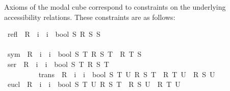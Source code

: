 \begin{isabellebody}
\isamarkuptrue%
%
\isamarkuptrue%
%
\begin{isamarkuptext}%
Axioms of the modal cube correspond to constraints on the underlying accessibility relations.
These constraints are as follows:%
\end{isamarkuptext}%
\isamarkuptrue%
\isanewline
{}\isamarkupfalse%
\ {\isachardoublequoteopen}refl\ {\isasymequiv}\ {\isasymlambda}R\ {\isacharcolon}{\isacharcolon}\ {\isacharparenleft}i\ {\isasymRightarrow}\ i\ {\isasymRightarrow}\ bool{\isacharparenright}{\isachardot}\ {\isasymforall}S{\isachardot}\ R\ S\ S{\isachardoublequoteclose}\ \ \ \ \ \ \ \ \ \ \ \ \ \ \ \ \ \ \ \ \ \ \ \ \ \ \ \ \ \ \ \ \ \ \ \ \ \ \ \ \ \ \ \ \ \ \ \ \ \ \ \ \ \ \ \ \ %
\isanewline
{}\isamarkupfalse%
\ {\isachardoublequoteopen}sym\ {\isasymequiv}\ {\isasymlambda}R\ {\isacharcolon}{\isacharcolon}\ {\isacharparenleft}i\ {\isasymRightarrow}\ i\ {\isasymRightarrow}\ bool{\isacharparenright}{\isachardot}\ {\isasymforall}S\ T{\isachardot}\ {\isacharparenleft}R\ S\ T\ {\isasymlongrightarrow}\ R\ T\ S{\isacharparenright}{\isachardoublequoteclose}\ \ \ \ \ \ \ \ \ \ \ \ \ \ \ \ \ \ \ \ \ \ \ \ \ \ \ \ \ \ \ \ %
\isanewline
{}\isamarkupfalse%
\ {\isachardoublequoteopen}ser\ {\isasymequiv}\ {\isasymlambda}R\ {\isacharcolon}{\isacharcolon}\ {\isacharparenleft}i\ {\isasymRightarrow}\ i\ {\isasymRightarrow}\ bool{\isacharparenright}{\isachardot}\ {\isasymforall}S{\isachardot}\ {\isasymexists}T{\isachardot}\ R\ S\ T{\isachardoublequoteclose}\ \ \ \ \ \ \ \ \ \ \ \ \ \ \ \ \ \ \ \ \ \ \ \ \ \ \ \ \ \ \ \ \ \ \ \ \ \ \ \ \ \ \ \ \ \ \ \ \ \ %
\isanewline
{}\isamarkupfalse%
\ {\isachardoublequoteopen}trans\ {\isasymequiv}\ {\isasymlambda}R\ {\isacharcolon}{\isacharcolon}\ {\isacharparenleft}i\ {\isasymRightarrow}\ i\ {\isasymRightarrow}\ bool{\isacharparenright}{\isachardot}\ {\isasymforall}S\ T\ U{\isachardot}\ {\isacharparenleft}R\ S\ T\ {\isasymand}\ R\ T\ U\ {\isasymlongrightarrow}\ R\ S\ U{\isacharparenright}{\isachardoublequoteclose}\ \ \ \ \ \ \ \ \ \ \ %
\isanewline
{}\isamarkupfalse%
\ {\isachardoublequoteopen}eucl\ {\isasymequiv}\ {\isasymlambda}R\ {\isacharcolon}{\isacharcolon}\ {\isacharparenleft}i\ {\isasymRightarrow}\ i\ {\isasymRightarrow}\ bool{\isacharparenright}{\isachardot}\ {\isasymforall}S\ T\ U{\isachardot}\ {\isacharparenleft}R\ S\ T\ {\isasymand}\ R\ S\ U\ {\isasymlongrightarrow}\ R\ T\ U{\isacharparenright}{\isachardoublequoteclose}\ \ \ \ \ \ \ \ \ \ \ \ \ %

\end{isabellebody}
